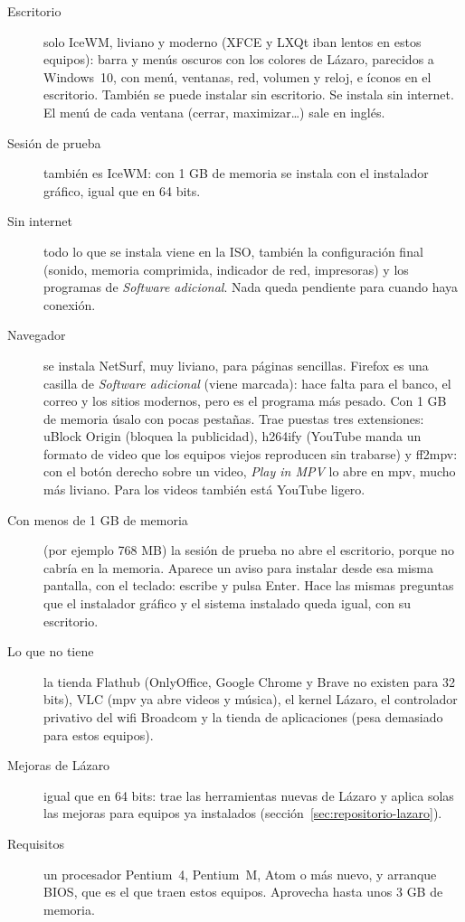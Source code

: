 \begin{description}
  \item[Escritorio] solo IceWM, liviano y moderno (XFCE y LXQt iban
    lentos en estos equipos): barra y menús oscuros con los colores de
    Lázaro, parecidos a Windows~10, con menú, ventanas, red, volumen y
    reloj, e íconos en el escritorio. También se puede instalar sin
    escritorio. Se instala sin internet. El menú de cada ventana
    (cerrar, maximizar\ldots) sale en inglés.
  \item[Sesión de prueba] también es IceWM: con 1 GB de memoria se
    instala con el instalador gráfico, igual que en 64 bits.
  \item[Sin internet] todo lo que se instala viene en la ISO, también la
    configuración final (sonido, memoria comprimida, indicador de red,
    impresoras) y los programas de \emph{Software adicional}. Nada queda
    pendiente para cuando haya conexión.
  \item[Navegador] se instala
    NetSurf, muy liviano, para páginas sencillas. Firefox es una casilla de \emph{Software adicional} (viene
    marcada): hace falta para el banco, el correo y los sitios modernos,
    pero es el programa más pesado. Con 1 GB de memoria úsalo con pocas
    pestañas. Trae puestas tres extensiones: uBlock Origin (bloquea la
    publicidad), h264ify (YouTube manda un formato de video que los
    equipos viejos reproducen sin trabarse) y ff2mpv: con el botón
    derecho sobre un video, \emph{Play in MPV} lo abre en mpv, mucho más
    liviano. Para los videos también está YouTube ligero.
  \item[Con menos de 1 GB de memoria] (por ejemplo 768 MB) la sesión de
    prueba no abre el escritorio, porque no cabría en la memoria.
    Aparece un aviso para instalar desde esa misma pantalla, con el
    teclado: escribe  y pulsa Enter.
    Hace las mismas preguntas que el instalador gráfico y el sistema
    instalado queda igual, con su escritorio.
  \item[Lo que no tiene] la tienda Flathub (OnlyOffice, Google Chrome y
    Brave no existen para 32 bits), VLC (mpv ya abre videos y música),
    el kernel Lázaro, el controlador privativo del wifi
    Broadcom y la tienda de aplicaciones (pesa demasiado para estos
    equipos).
  \item[Mejoras de Lázaro] igual que en 64 bits:  trae las herramientas nuevas de Lázaro y aplica solas las
    mejoras para equipos ya instalados
    (sección~\ref{sec:repositorio-lazaro}).
  \item[Requisitos] un procesador Pentium~4, Pentium~M, Atom o más nuevo,
    y arranque BIOS, que es el que traen estos equipos. Aprovecha hasta
    unos 3 GB de memoria.
\end{description}

